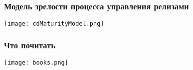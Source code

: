 \documentclass{../../slides-style}
\begin{document}
    \begin{frame}
        \frametitle{Модель зрелости процесса управления релизами}
        \begin{center}
            \texttt{[image: cdMaturityModel.png]}
        \end{center}
    \end{frame}

    \begin{frame}
        \frametitle{Что почитать}
        \begin{center}
            \texttt{[image: books.png]}
        \end{center}
    \end{frame}
\end{document}
